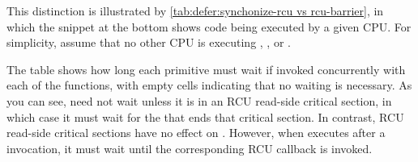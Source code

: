 {{\begin{table}
\renewcommand*{\arraystretch}{1.2}
\centering
\small
{}

\begin{fcvlabel}
\end{fcvlabel}
\caption{ vs. }
\label{tab:defer:synchonize-rcu vs rcu-barrier}
\end{table}

	This distinction is illustrated by
	\cref{tab:defer:synchonize-rcu vs rcu-barrier}, in which
	the snippet at the bottom shows code being executed by a given CPU\@.
	For simplicity, assume that no other CPU is executing
	, , or
	.

	The table shows how long each primitive must wait if invoked
	concurrently with each of the 
	functions, with empty cells indicating that no
	waiting is necessary.
	As you can see,  need not wait unless
	it is in an RCU read-side critical section, in which case
	it must wait for the  that ends that
	critical section.
	In contrast, RCU read-side critical sections have no effect
	on .
	However, when  executes after a
	 invocation, it must wait until the
	corresponding RCU callback is invoked.

}}
